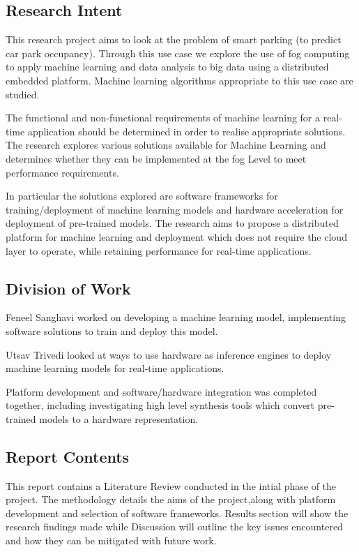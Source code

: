 \subsection{Research Intent}

This research project aims to look at the problem of smart parking (to predict car park occupancy). Through this use case we explore the use of fog computing to apply machine learning and data analysis to big data using a distributed embedded platform. Machine learning algorithms appropriate to this use case are studied.  

 

The functional and non-functional requirements of machine learning for a real-time application should be determined in order to realise appropriate solutions. The research explores various solutions available for Machine Learning and determines whether they can be implemented at the fog Level to meet performance requirements.  

 

In particular the solutions explored are software frameworks for training/deployment of machine learning models and hardware acceleration for deployment of pre-trained models. The research aims to propose a distributed platform for machine learning and deployment which does not require the cloud layer to operate, while retaining performance for real-time applications.  
\subsection{Division of Work}
Feneel Sanghavi worked on developing a machine learning model, implementing software solutions to train and deploy this model.  

Utsav Trivedi looked at ways to use hardware as inference engines to deploy machine learning models for real-time applications.  


Platform development and software/hardware integration was completed together, including investigating high level synthesis tools which convert pre-trained models to a hardware representation.  

\subsection{ Report Contents}
This report contains a Literature Review conducted in the intial phase of the project. 
The methodology details the aims of the project,along with platform development and selection of software frameworks.
Results section will show the research findings made while Discussion will outline the key issues encountered and how they can be mitigated with future work. 

